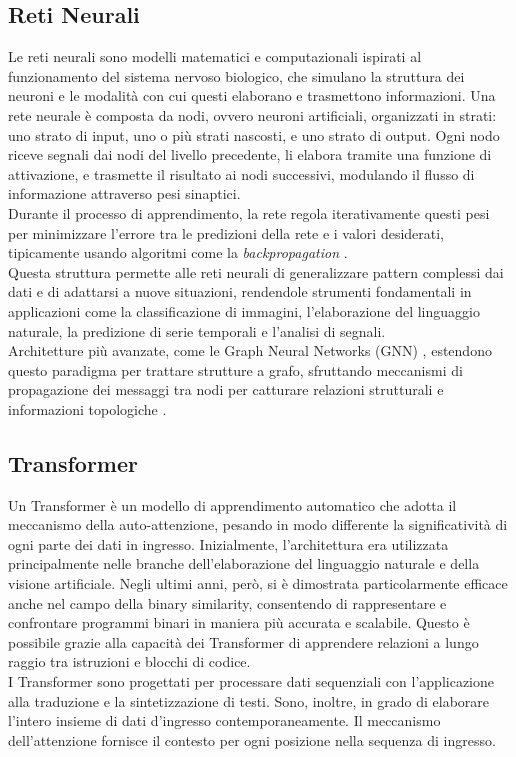 \documentclass[12pt,a4paper,openright,twoside]{report}
\begin{document}
\subsection{Reti Neurali}

Le reti neurali sono modelli matematici e computazionali ispirati al funzionamento del sistema nervoso biologico, che simulano la struttura dei neuroni e le modalità con cui questi elaborano e trasmettono informazioni. Una rete neurale è composta da nodi, ovvero neuroni artificiali, organizzati in strati: uno strato di input, uno o più strati nascosti, e uno strato di output. Ogni nodo riceve segnali dai nodi del livello precedente, li elabora tramite una funzione di attivazione, e trasmette il risultato ai nodi successivi, modulando il flusso di informazione attraverso pesi sinaptici.\\
Durante il processo di apprendimento, la rete regola iterativamente questi pesi per minimizzare l’errore tra le predizioni della rete e i valori desiderati, tipicamente usando algoritmi come la \textit{backpropagation} \cite{goodfellow2016deep}.\\
Questa struttura permette alle reti neurali di generalizzare pattern complessi dai dati e di adattarsi a nuove situazioni, rendendole strumenti fondamentali in applicazioni come la classificazione di immagini, l’elaborazione del linguaggio naturale, la predizione di serie temporali e l’analisi di segnali.\\
Architetture più avanzate, come le Graph Neural Networks (GNN) \cite{gnn}, estendono questo paradigma per trattare strutture a grafo, sfruttando meccanismi di propagazione dei messaggi tra nodi per catturare relazioni strutturali e informazioni topologiche \cite{wu2021gnn}.

\subsection{Transformer}

Un Transformer \cite{Transformer} è un modello di apprendimento automatico che adotta il meccanismo della auto-attenzione, pesando in modo differente la significatività di ogni parte dei dati in ingresso. Inizialmente, l’architettura era utilizzata principalmente nelle branche dell’elaborazione del linguaggio naturale e della visione artificiale. Negli ultimi anni, però, si è dimostrata particolarmente efficace anche nel campo della binary similarity, consentendo di rappresentare e confrontare programmi binari in maniera più accurata e scalabile. Questo è possibile grazie alla capacità dei Transformer di apprendere relazioni a lungo raggio tra istruzioni e blocchi di codice.\\
I Transformer sono progettati per processare dati sequenziali con l'applicazione alla traduzione e la sintetizzazione di testi. Sono, inoltre, in grado di elaborare l'intero insieme di dati d'ingresso contemporaneamente. Il meccanismo dell'attenzione fornisce il contesto per ogni posizione nella sequenza di ingresso.
\newpage
\end{document}
